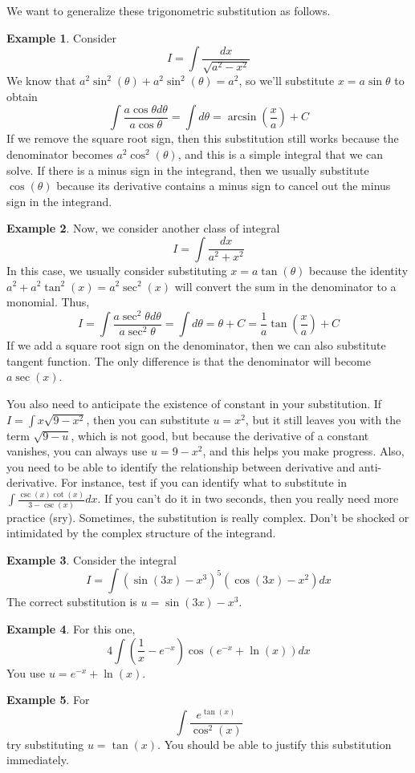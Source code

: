 \documentclass{article}
\theoremstyle{definition}
\theoremstyle{definition}
\theoremstyle{definition}
\theoremstyle{definition}
\theoremstyle{definition}
\theoremstyle{definition}
\newtheorem{example}{Example}
\theoremstyle{definition}
\theoremstyle{definition}
\theoremstyle{definition}
\begin{document}
We want to generalize these trigonometric substitution as follows.
\begin{example}
    Consider
    \[
    I=\int \dfrac{dx}{\sqrt{a^2-x^2}}    
    \]
    We know that $a^2\sin^2(\theta)+a^2\sin^2(\theta)=a^2$, so we'll substitute $x=a\sin\theta$ to obtain
    \[
    \int\dfrac{a\cos\theta d\theta}{a\cos\theta}=\int d\theta=\arcsin\left(\dfrac{x}{a}\right)+C    
    \]
    If we remove the square root sign, then this substitution still works because the denominator becomes $a^2\cos^2(\theta)$, and this is a simple integral that we can solve.
    If there is a minus sign in the integrand, then we usually substitute $\cos(\theta)$ because its derivative contains a minus sign to cancel out the minus sign in the integrand.
\end{example}
\begin{example}
    Now, we consider another class of integral
    \[
        I=\int\dfrac{dx}{a^2+x^2}
    \]
    In this case, we usually consider substituting $x=a\tan(\theta)$ because the identity $a^2+a^2\tan^2(x)=a^2\sec^2(x)$ will convert the sum in the denominator to a monomial.
    Thus,
    \[I=\int \dfrac{a\sec^2\theta d\theta}{a\sec^2\theta}=\int d\theta=\theta+C=\dfrac{1}{a}\tan\left(\dfrac{x}{a}\right)+C\]
    If we add a square root sign on the denominator, then we can also substitute tangent function. The only difference is that the denominator will become $a\sec(x)$.
\end{example}

You also need to anticipate the existence of constant in your substitution. If $I=\int x\sqrt{9-x^2}$, then you can substitute $u=x^2$, but it still leaves you with the term $\sqrt{9-u}$,
which is not good, but because the derivative of a constant vanishes, you can always use $u=9-x^2$, and this helps you make progress.
Also, you need to be able to identify the relationship between derivative and anti-derivative. For instance, test if you can identify what to substitute in $\int\frac{\csc(x)\cot(x)}{3-\csc(x)}dx$.
If you can't do it in two seconds, then you really need more practice (sry). Sometimes, the substitution is really complex. Don't be shocked or intimidated by the complex structure of the integrand.
\begin{example}
    Consider the integral
    \[I=\int(\sin(3x)-x^3)^5(\cos(3x)-x^2)dx\]
    The correct substitution is $u=\sin(3x)-x^3$.
\end{example}
\begin{example}
    For this one,
    \[4\int\left(\dfrac{1}{x}-e^{-x}\right)\cos(e^{-x}+\ln(x))dx\]
    You use $u=e^{-x}+\ln(x)$.
\end{example}
\begin{example}
    For $$\int\dfrac{e^{\tan(x)}}{\cos^2(x)}$$
    try substituting $u=\tan(x)$. You should be able to justify this substitution immediately.
\end{example}
\end{document}
